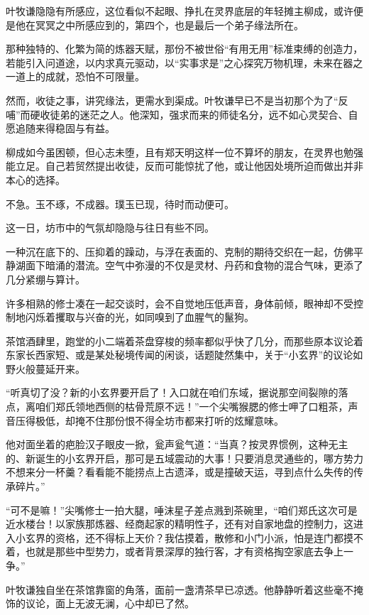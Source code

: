 叶牧谦隐隐有所感应，这位看似不起眼、挣扎在灵界底层的年轻摊主柳成，或许便是他在冥冥之中所感应到的，第四个，也是最后一个弟子缘法所在。

那种独特的、化繁为简的炼器天赋，那份不被世俗“有用无用”标准束缚的创造力，若能引入问道途，以内求真元驱动，以“实事求是”之心探究万物机理，未来在器之一道上的成就，恐怕不可限量。

然而，收徒之事，讲究缘法，更需水到渠成。叶牧谦早已不是当初那个为了“反哺”而硬收徒弟的迷茫之人。他深知，强求而来的师徒名分，远不如心灵契合、自愿追随来得稳固与有益。

柳成如今虽困顿，但心志未堕，且有郑天明这样一位不算坏的朋友，在灵界也勉强能立足。自己若贸然提出收徒，反而可能惊扰了他，或让他因处境所迫而做出并非本心的选择。

不急。玉不琢，不成器。璞玉已现，待时而动便可。

\vspace{2em}

这一日，坊市中的气氛却隐隐与往日有些不同。

一种沉在底下的、压抑着的躁动，与浮在表面的、克制的期待交织在一起，仿佛平静湖面下暗涌的潜流。空气中弥漫的不仅是灵材、丹药和食物的混合气味，更添了几分紧绷与算计。

许多相熟的修士凑在一起交谈时，会不自觉地压低声音，身体前倾，眼神却不受控制地闪烁着攫取与兴奋的光，如同嗅到了血腥气的鬣狗。

茶馆酒肆里，跑堂的小二端着茶盘穿梭的频率都似乎快了几分，而那些原本议论着东家长西家短、或是某处秘境传闻的闲谈，话题陡然集中，关于“小玄界”的议论如野火般蔓延开来。

“听真切了没？新的小玄界要开启了！入口就在咱们东域，据说那空间裂隙的落点，离咱们郑氏领地西侧的枯骨荒原不远！”一个尖嘴猴腮的修士呷了口粗茶，声音压得极低，却掩不住那份恨不得全坊市都来打听的炫耀意味。

他对面坐着的疤脸汉子眼皮一掀，瓮声瓮气道：“当真？按灵界惯例，这种无主的、新诞生的小玄界开启，那可是五域震动的大事！只要消息灵通些的，哪方势力不想来分一杯羹？看看能不能捞点上古遗泽，或是撞破天运，寻到点什么失传的传承碎片。”

“可不是嘛！”尖嘴修士一拍大腿，唾沫星子差点溅到茶碗里，“咱们郑氏这次可是近水楼台！以家族那炼器、经商起家的精明性子，还有对自家地盘的控制力，这进入小玄界的资格，还不得标上天价？我估摸着，散修和小门小派，怕是连门都摸不着，也就是那些中型势力，或者背景深厚的独行客，才有资格掏空家底去争上一争。”

叶牧谦独自坐在茶馆靠窗的角落，面前一盏清茶早已凉透。他静静听着这些毫不掩饰的议论，面上无波无澜，心中却已了然。

